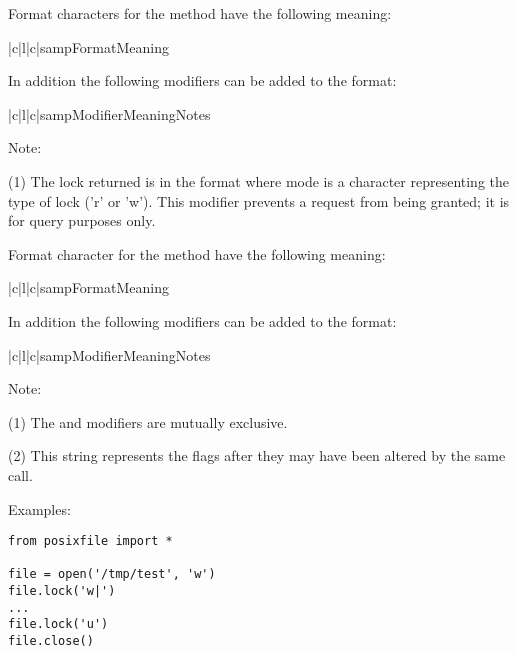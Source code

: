 Format characters for the  method have the following meaning:

\begin{tableiii}{|c|l|c|}{samp}{Format}{Meaning}{}
\end{tableiii}

In addition the following modifiers can be added to the format:

\begin{tableiii}{|c|l|c|}{samp}{Modifier}{Meaning}{Notes}
\end{tableiii}

Note:

(1) The lock returned is in the format  where mode is a character representing the type of lock
('r' or 'w').  This modifier prevents a request from being granted; it
is for query purposes only.

Format character for the  method have the following meaning:

\begin{tableiii}{|c|l|c|}{samp}{Format}{Meaning}{}
\end{tableiii}

In addition the following modifiers can be added to the format:

\begin{tableiii}{|c|l|c|}{samp}{Modifier}{Meaning}{Notes}
\end{tableiii}

Note:

(1) The \code{!} and \code{=} modifiers are mutually exclusive.

(2) This string represents the flags after they may have been altered
by the same call.

Examples:

\bcode\begin{verbatim}
from posixfile import *

file = open('/tmp/test', 'w')
file.lock('w|')
...
file.lock('u')
file.close()
\end{verbatim}\ecode
